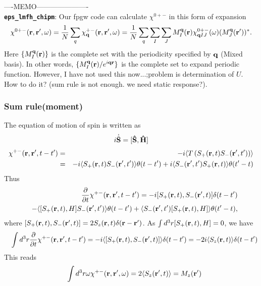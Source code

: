 \documentclass[a4paper,10pt,epsf,fleqn]{article}
\newcommand{\bfq}{{\bf q}}
\newcommand{\bfr}{{\bf r}}
\begin{document}
\noindent ----MEMO----------------------\\
{\bf \tt eps\_lmfh\_chipm}: Our fpgw code can calculate
$\chi^{0+-}$ in this form of expansion
\begin{eqnarray}
\chi^{0+-}(\bfr,\bfr',\omega) 
= \frac{1}{N}\sum_q \chi^{+-}_\bfq(\bfr,\bfr',\omega)
= \frac{1}{N}\sum_q \sum_I \sum_J
M^\bfq_I(\bfr) \chi^{0+-}_{\bfq IJ}(\omega) (M^\bfq_J(\bfr'))^*.
\label{chiexpand}
\end{eqnarray}
Here $\{ M^\bfq_I(\bfr) \}$ is the complete set with the periodicity specified 
by $\bfq$ (Mixed basis).
In other words, $\{ M^\bfq_I(\bfr) /e^{i \bfq \bfr} \}$ 
is the complete set to expand periodic function.
However, I have not used this now...;problem is determination of $U$. How to do it?
(sum rule is not enough. we need static response?).


\subsubsection{Sum rule(moment)} 
The equation of motion of spin is written as
\begin{eqnarray}
i \dot{\hat{\bf S}} = [\hat{\bf S},  \hat{H}]
\end{eqnarray}
\begin{eqnarray}
\chi^{+-}(\bfr,\bfr',t-t') 
&=& -i\langle T\left( S_+(\bfr,t) S_-(\bfr',t') \right) \rangle                \nonumber\\
&=& -i\langle S_+(\bfr,t)   S_-(\bfr',t') \rangle \theta(t-t')
+ i\langle S_-(\bfr',t') S_+(\bfr,t)   \rangle \theta(t'-t)
\end{eqnarray}
Thus
\begin{eqnarray}
&&\frac{\partial }{\partial t} \chi^{+-}(\bfr,\bfr',t-t') 
= -i [S_+(\bfr,t),   S_-(\bfr',t)] \delta(t-t') \nonumber\\
&&-  \langle [S_+(\bfr,t),H]   S_-(\bfr',t') \rangle \theta(t-t') 
+  \langle S_-(\bfr',t')   [S_+(\bfr,t),H] \rangle \theta(t'-t),
\end{eqnarray}
where $[S_+(\bfr,t), S_-(\bfr',t)]= 2S_z(\bfr,t) \delta(\bfr-\bfr')$.
As $\int d^3r [S_+(\bfr,t),H]=0$, we have
\begin{eqnarray}
&&\int d^3r \frac{\partial }{\partial t} \chi^{+-}(\bfr,\bfr',t-t') 
= -i \langle [S_+(\bfr,t),   S_-(\bfr',t)] \rangle \delta(t-t') 
= -2 i \langle S_z(\bfr,t) \rangle \delta(t-t') 
\end{eqnarray}
This reads
\begin{eqnarray}
&&\int d^3r \omega \chi^{+-}(\bfr,\bfr',\omega) 
= 2 \langle S_z(\bfr',t) \rangle = M_z(\bfr') 
\end{eqnarray}
\end{document}
